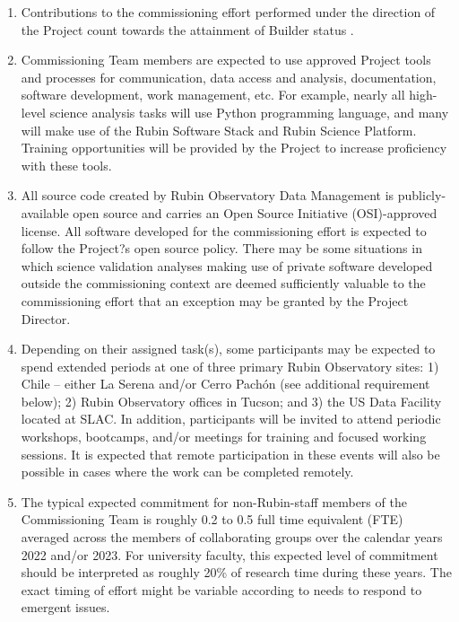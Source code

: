 \documentclass[SE,authoryear,toc]{lsstdoc}
\begin{document}
\begin{enumerate}
\item Contributions to the commissioning effort performed under the direction of the Project count towards the attainment of Builder status .

\item Commissioning Team members are expected to use approved Project tools and processes for communication, data access and analysis, documentation, software development, work management, etc. For example, nearly all high-level science analysis tasks will use Python programming language, and many will make use of the Rubin Software Stack and Rubin Science Platform. Training opportunities will be provided by the Project to increase proficiency with these tools. 

\item All source code created by Rubin Observatory Data Management is publicly-available open source and carries an Open Source Initiative (OSI)-approved license. All software developed for the commissioning effort is expected to follow the Project?s open source policy. There may be some situations in which science validation analyses making use of private software developed outside the commissioning context are deemed sufficiently valuable to the commissioning effort that an exception may be granted by the Project Director. 

\item Depending on their assigned task(s), some participants may be expected to spend extended periods at one of three primary Rubin Observatory sites: 1) Chile -- either La Serena and/or Cerro Pach\'{o}n (see additional requirement below); 2) Rubin Observatory offices in Tucson; and 3) the US Data Facility located at SLAC. In addition, participants will be invited to attend periodic workshops, bootcamps, and/or meetings for training and focused working sessions. It is expected that remote participation in these events will also be possible in cases where the work can be completed remotely.


\item The typical expected commitment for non-Rubin-staff members of the Commissioning Team is roughly 0.2 to 0.5 full time equivalent (FTE) averaged across the members of collaborating groups over the calendar years 2022 and/or 2023. For university faculty, this expected level of commitment should be interpreted as roughly 20\% of research time during these years. The exact timing of effort might be variable according to needs to respond to emergent issues. 


\end{enumerate}
\end{document}
